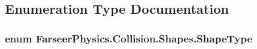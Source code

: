 \subsection{Enumeration Type Documentation}
\hypertarget{namespace_farseer_physics_1_1_collision_1_1_shapes_a54e12281f639907006495f4af9f45d5e}{
\subsubsection[{Shape\+Type}]{\setlength{\rightskip}{0pt plus 5cm}enum {\bf Farseer\+Physics.\+Collision.\+Shapes.\+Shape\+Type}}}\label{namespace_farseer_physics_1_1_collision_1_1_shapes_a54e12281f639907006495f4af9f45d5e}
